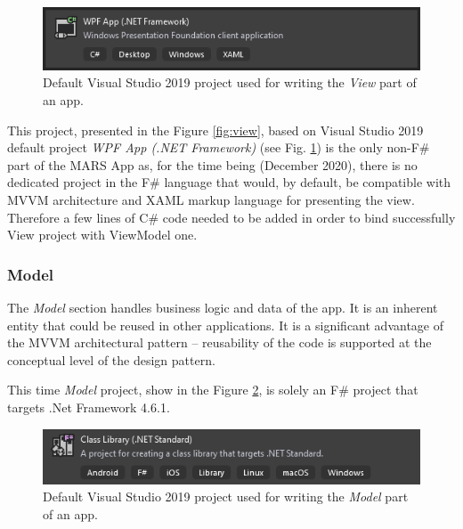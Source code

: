         \begin{figure}[H]
            \centering
            \includegraphics{img/view_wpfApp.png}
            \caption{Default Visual Studio 2019 project used for writing the \textit{View} part of an app.}
            \label{fig:view_wpfApp}
        \end{figure}
        
        \noindent
        This project, presented in the Figure \ref{fig:view}, based on Visual Studio 2019 default project \textit{WPF App (.NET Framework)} (see Fig. \ref{fig:view_wpfApp}) is the only non-F\# part of the MARS App as, for the time being (December 2020), there is no dedicated project in the F\# language that would, by default, be compatible with MVVM architecture and XAML markup language for presenting the view. Therefore a few lines of C\# code needed to be added in order to bind successfully View project with ViewModel one.
        

    \subsubsection{Model} 
        The \textit{Model} section handles business logic and data of the app. It is an inherent entity that could be reused in other applications. It is a significant advantage of the MVVM architectural pattern -- reusability of the code is supported at the conceptual level of the design pattern.
        
        This time \textit{Model} project, show in the Figure \ref{fig:model_VS19Project}, is solely an F\# project that targets .Net Framework 4.6.1.
        \begin{figure}[H]
            \centering
            \includegraphics{img/model_VS19Project.png}
            \caption{Default Visual Studio 2019 project used for writing the \textit{Model} part of an app.}
            \label{fig:model_VS19Project}
        \end{figure}
        
